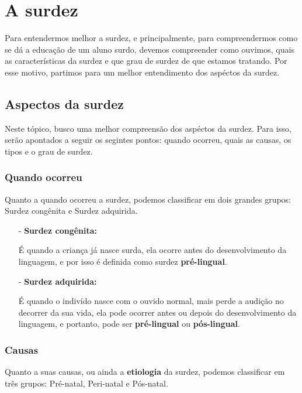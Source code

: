 \documentclass[brasil]{abnt}
\begin{document}
\anexo
\chapter{A surdez}
	Para entendermos melhor a surdez, e principalmente, para compreendermos como se dá a educação de um aluno surdo, devemos compreender como ouvimos, quais as características da surdez e 
	que grau de surdez de que estamos tratando. Por esse motivo, partimos para um melhor entendimento dos aspéctos da surdez.	
			
		\section{Aspectos da surdez}
			Neste tópico, busco uma melhor compreensão dos aspéctos da surdez. Para isso, serão apontados a seguir os segintes pontos: quando ocorreu, 
			quais as causas, os tipos e o grau de surdez. 
			
			\subsection{Quando ocorreu}
				Quanto a quando ocorreu a surdez, podemos classificar em dois grandes grupos: Surdez congênita e Surdez adquirida. 
				
				\begin{itemize}		
					\item [-]\textbf{Surdez congênita:} 
					
						É quando a criança já nasce surda, ela ocorre antes do desenvolvimento da linguagem, e por isso é definida como 
						surdez \textbf{pré-lingual}. 
						
					\item[-]\textbf{Surdez adquirida:} 
					
						É quando o indivído nasce com o ouvido normal, mais perde a audição no decorrer da sua vida, ela pode ocorrer antes ou depois do 
						desenvolvimento da linguagem, e portanto, pode ser \textbf{pré-lingual} ou \textbf{pós-lingual}.
				\end{itemize}
				
				
			\subsection{Causas}
				Quanto a suas causas, ou ainda a \textbf{etiologia} da surdez, podemos classificar em três grupos: Pré-natal, Peri-natal e Pós-natal.
			
\end{document}
